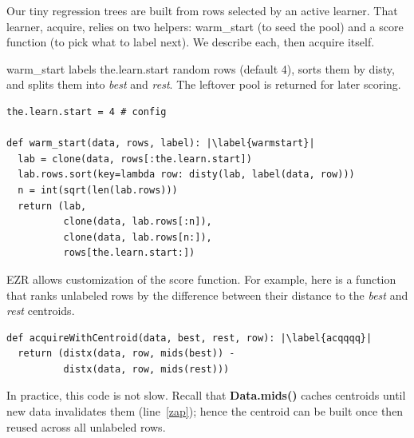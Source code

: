\documentclass[AMA,STIX2COL]{WileyNJDv5}
\newcommand{\cls}[1]{%
  \setlength{\fboxsep}{1.5pt}%
  \colorbox{clsbg}{\sffamily\bfseries{#1}}%
}
\begin{document}
Our tiny regression trees are built from rows selected by an active 
learner. That learner, \textsf{acquire}, relies on two helpers: 
\textsf{warm\_start} (to seed the pool) and a \textsf{score} function 
(to pick what to label next). We describe each, then \textsf{acquire} 
itself.

\textsf{warm\_start} labels \textsf{the.learn.start} random rows
(default 4), sorts them by \textsf{disty}, and splits them into
\textit{best} and \textit{rest}. The leftover pool is returned for
later scoring.
\begin{verbatim}
the.learn.start = 4 # config

def warm_start(data, rows, label): |\label{warmstart}|
  lab = clone(data, rows[:the.learn.start])
  lab.rows.sort(key=lambda row: disty(lab, label(data, row)))
  n = int(sqrt(len(lab.rows)))
  return (lab,
          clone(data, lab.rows[:n]),
          clone(data, lab.rows[n:]),
          rows[the.learn.start:])
\end{verbatim}
EZR allows  customization of the 
\textsf{score} function. For example,
here is a function that ranks unlabeled rows by the difference between their 
distance to the \textit{best} and \textit{rest} centroids. 
\begin{verbatim}
def acquireWithCentroid(data, best, rest, row): |\label{acqqqq}|
  return (distx(data, row, mids(best)) -
          distx(data, row, mids(rest)))
\end{verbatim}
In practice, this code is not slow. Recall that 
\cls{Data.mids()} caches centroids until new data invalidates them 
(line~\ref{zap}); hence the centroid
can be  built once  then reused across all unlabeled rows.
\end{document}
